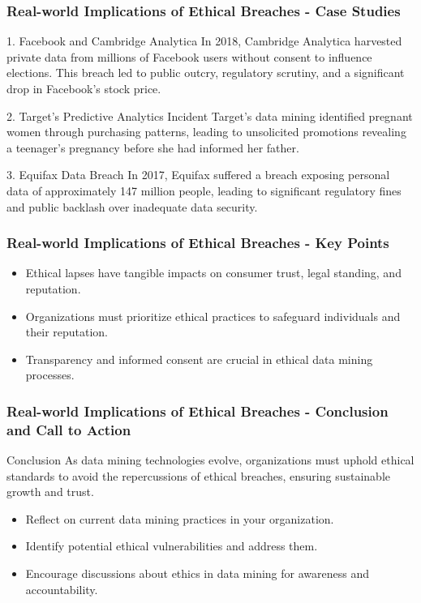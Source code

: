 \documentclass[aspectratio=169]{beamer}
\begin{document}
\begin{frame}[fragile]
    \frametitle{Real-world Implications of Ethical Breaches - Case Studies}
    \begin{block}{1. Facebook and Cambridge Analytica}
        In 2018, Cambridge Analytica harvested private data from millions of Facebook users without consent to influence elections. This breach led to public outcry, regulatory scrutiny, and a significant drop in Facebook's stock price.
    \end{block}
    
    \begin{block}{2. Target's Predictive Analytics Incident}
        Target's data mining identified pregnant women through purchasing patterns, leading to unsolicited promotions revealing a teenager's pregnancy before she had informed her father.
    \end{block}
    
    \begin{block}{3. Equifax Data Breach}
        In 2017, Equifax suffered a breach exposing personal data of approximately 147 million people, leading to significant regulatory fines and public backlash over inadequate data security.
    \end{block}
\end{frame}

\begin{frame}[fragile]
    \frametitle{Real-world Implications of Ethical Breaches - Key Points}
    \begin{itemize}
        \item Ethical lapses have tangible impacts on consumer trust, legal standing, and reputation.
        \item Organizations must prioritize ethical practices to safeguard individuals and their reputation.
        \item Transparency and informed consent are crucial in ethical data mining processes.
    \end{itemize}
\end{frame}

\begin{frame}[fragile]
    \frametitle{Real-world Implications of Ethical Breaches - Conclusion and Call to Action}
    \begin{block}{Conclusion}
        As data mining technologies evolve, organizations must uphold ethical standards to avoid the repercussions of ethical breaches, ensuring sustainable growth and trust.
    \end{block}
    
    \begin{itemize}
        \item Reflect on current data mining practices in your organization.
        \item Identify potential ethical vulnerabilities and address them.
        \item Encourage discussions about ethics in data mining for awareness and accountability.
    \end{itemize}
\end{frame}
\end{document}
